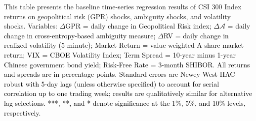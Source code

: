 \documentclass[preprint,12pt,authoryear]{elsarticle}
\begin{document}
\begin{table}[htbp]
\begin{threeparttable}
\begin{tablenotes}[flushleft]
\item[] This table presents the baseline time-series regression results of CSI 300 Index returns on geopolitical risk (GPR) shocks, ambiguity shocks, and volatility shocks. \textcolor{black}{Variables: $\Delta$GPR = daily change in Geopolitical Risk index; $\Delta \mathcal{A}$ = daily change in cross-entropy-based ambiguity measure; $\Delta$RV = daily change in realized volatility (5-minute); Market Return = value-weighted A-share market return; VIX = CBOE Volatility Index; Term Spread = 10-year minus 1-year Chinese government bond yield; Risk-Free Rate = 3-month SHIBOR. All returns and spreads are in percentage points.} \textcolor{black}{Standard errors are Newey-West HAC robust with 5-day lags (unless otherwise specified) to account for serial correlation up to one trading week; results are qualitatively similar for alternative lag selections. ***, **, and * denote significance at the 1\%, 5\%, and 10\% levels, respectively.}
\end{tablenotes}
\end{threeparttable}
\end{table}
\end{document}
